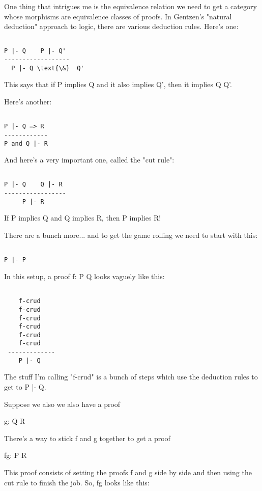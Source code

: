 One thing that intrigues me is the equivalence relation we need to get 
a category whose morphisms are equivalence classes of proofs.  In 
Gentzen's "natural deduction" approach to logic, there are various 
deduction rules.  Here's one: 


\begin{verbatim}

P |- Q    P |- Q'
------------------
  P |- Q \text{\&}  Q'
\end{verbatim}
    

This says that if P implies Q and it also implies Q', then it 
implies Q \text{\&}  Q'.   

Here's another:


\begin{verbatim}

P |- Q => R
------------
P and Q |- R
\end{verbatim}
    
And here's a very important one, called the "cut rule":


\begin{verbatim}

P |- Q    Q |- R
-----------------
     P |- R
\end{verbatim}
    
If P implies Q and Q implies R, then P implies R!

There are a bunch more... and to get the game rolling we need
to start with this:


\begin{verbatim}

P |- P
\end{verbatim}
    
In this setup, a proof f: P \to  Q looks vaguely like this:


\begin{verbatim}

    f-crud
    f-crud
    f-crud
    f-crud
    f-crud
    f-crud
 -------------
    P |- Q 
\end{verbatim}
    
The stuff I'm calling "f-crud" is a bunch of steps which use the
deduction rules to get to P |- Q.  

Suppose we also we also have a proof

g: Q \to  R

There's a way to stick f and g together to get a proof

fg: P \to  R

This proof consists of setting the proofs f and g side by side and then
using the cut rule to finish the job.  So, fg looks like this:


